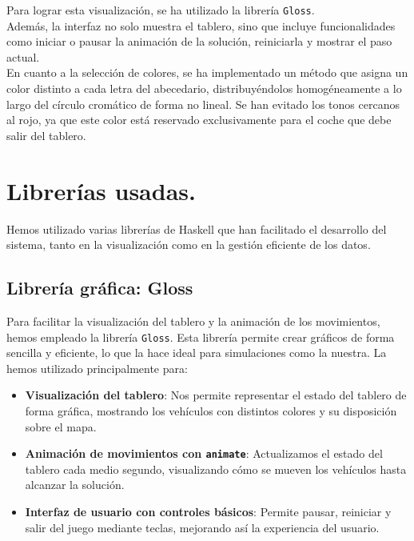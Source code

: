 \documentclass{article}
\begin{document}
Para lograr esta visualización, se ha utilizado la librería \texttt{Gloss}.\\

Además, la interfaz no solo muestra el tablero, sino que incluye funcionalidades como iniciar o pausar la animación de la solución, reiniciarla y mostrar el paso actual.\\

En cuanto a la selección de colores, se ha implementado un método que asigna un color distinto a cada letra del abecedario, distribuyéndolos homogéneamente a lo largo del círculo cromático de forma no lineal. Se han evitado los tonos cercanos al rojo, ya que este color está reservado exclusivamente para el coche que debe salir del tablero.

\newpage
\section{Librerías usadas.}

Hemos utilizado varias librerías de Haskell que han facilitado el desarrollo del sistema, tanto en la visualización como en la gestión eficiente de los datos.

\subsection{Librería gráfica: Gloss}

Para facilitar la visualización del tablero y la animación de los movimientos, hemos empleado la librería \texttt{Gloss}. Esta librería permite crear gráficos de forma sencilla y eficiente, lo que la hace ideal para simulaciones como la nuestra. La hemos utilizado principalmente para:

\begin{itemize}
  \item \textbf{Visualización del tablero}: Nos permite representar el estado del tablero de forma gráfica, mostrando los vehículos con distintos colores y su disposición sobre el mapa.
  
  \item \textbf{Animación de movimientos con \texttt{animate}}: Actualizamos el estado del tablero cada medio segundo, visualizando cómo se mueven los vehículos hasta alcanzar la solución.
  
  \item \textbf{Interfaz de usuario con controles básicos}: Permite pausar, reiniciar y salir del juego mediante teclas, mejorando así la experiencia del usuario.
\end{itemize}
\end{document}
